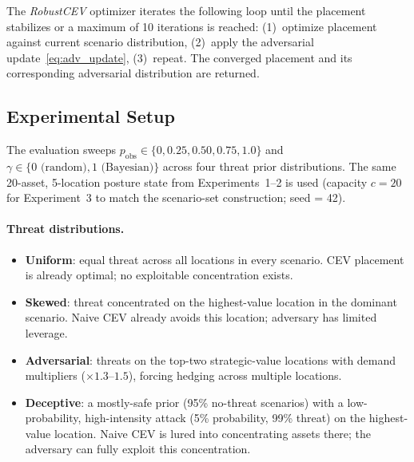 \documentclass[11pt]{article}
\begin{document}
The \emph{RobustCEV} optimizer iterates the following loop until the
placement stabilizes or a maximum of 10 iterations is reached:
(1)~optimize placement against current scenario distribution,
(2)~apply the adversarial update~\eqref{eq:adv_update},
(3)~repeat.
The converged placement and its corresponding adversarial distribution
are returned.

\subsection{Experimental Setup}
\label{sec:exp3:setup}

The evaluation sweeps $p_\mathrm{obs} \in \{0, 0.25, 0.50, 0.75, 1.0\}$
and $\gamma \in \{0\text{ (random)}, 1\text{ (Bayesian)}\}$ across
four threat prior distributions.  The same 20-asset, 5-location
posture state from Experiments~1--2 is used (capacity $c = 20$ for
Experiment~3 to match the scenario-set construction; seed = 42).

\paragraph{Threat distributions.}
\begin{itemize}
    \item \textbf{Uniform}: equal threat across all locations in every
          scenario.  CEV placement is already optimal; no exploitable
          concentration exists.
    \item \textbf{Skewed}: threat concentrated on the highest-value
          location in the dominant scenario.  Naive CEV already avoids
          this location; adversary has limited leverage.
    \item \textbf{Adversarial}: threats on the top-two strategic-value
          locations with demand multipliers ($\times 1.3$--$1.5$), forcing
          hedging across multiple locations.
    \item \textbf{Deceptive}: a mostly-safe prior (95\% no-threat scenarios)
          with a low-probability, high-intensity attack (5\% probability,
          99\% threat) on the highest-value location.  Naive CEV is lured
          into concentrating assets there; the adversary can fully exploit
          this concentration.
\end{itemize}
\end{document}
